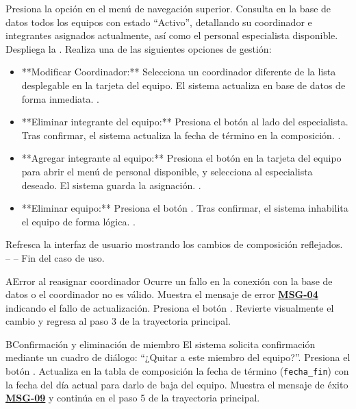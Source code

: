 \begin{UCtrayectoria}
	\UCpaso[\UCactor] Presiona la opción  en el menú de navegación superior.
	\UCpaso Consulta en la base de datos todos los equipos con estado ``Activo'', detallando su coordinador e integrantes asignados actualmente, así como el personal especialista disponible.
	\UCpaso Despliega la .
	\UCpaso[\UCactor] Realiza una de las siguientes opciones de gestión:
		\begin{itemize}
			\item **Modificar Coordinador:** Selecciona un coordinador diferente de la lista desplegable en la tarjeta del equipo. El sistema actualiza en base de datos de forma inmediata. .
			\item **Eliminar integrante del equipo:** Presiona el botón  al lado del especialista. Tras confirmar, el sistema actualiza la fecha de término en la composición. .
			\item **Agregar integrante al equipo:** Presiona el botón \IUbutton{+} en la tarjeta del equipo para abrir el menú de personal disponible, y selecciona al especialista deseado. El sistema guarda la asignación. .
			\item **Eliminar equipo:** Presiona el botón . Tras confirmar, el sistema inhabilita el equipo de forma lógica. .
		\end{itemize}
	\UCpaso Refresca la interfaz de usuario mostrando los cambios de composición reflejados.
	\UCpaso[] -- -- Fin del caso de uso.
\end{UCtrayectoria}

\begin{UCtrayectoriaA}{A}{Error al reasignar coordinador}
	\UCpaso Ocurre un fallo en la conexión con la base de datos o el coordinador no es válido.
	\UCpaso Muestra el mensaje de error \hyperlink{mMSG04}{\bf MSG-04} indicando el fallo de actualización.
	\UCpaso[\UCactor] Presiona el botón .
	\UCpaso Revierte visualmente el cambio y regresa al paso 3 de la trayectoria principal.
\end{UCtrayectoriaA}

\begin{UCtrayectoriaA}{B}{Confirmación y eliminación de miembro}
	\UCpaso El sistema solicita confirmación mediante un cuadro de diálogo: ``¿Quitar a este miembro del equipo?''.
	\UCpaso[\UCactor] Presiona el botón .
	\UCpaso Actualiza en la tabla de composición la fecha de término (\texttt{fecha\_fin}) con la fecha del día actual para darlo de baja del equipo.
	\UCpaso Muestra el mensaje de éxito \hyperlink{mMSG09}{\bf MSG-09} y continúa en el paso 5 de la trayectoria principal.
\end{UCtrayectoriaA}

